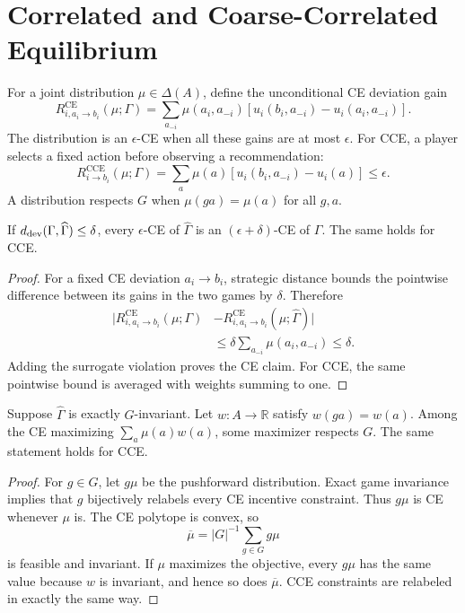 \section{Correlated and Coarse-Correlated Equilibrium}

For a joint distribution $\mu\in\Delta(A)$, define the unconditional CE deviation gain
\[
R^{\mathrm{CE}}_{i,a_i\to b_i}(\mu;\Gamma)
=
\sum_{a_{-i}}\mu(a_i,a_{-i})
[u_i(b_i,a_{-i})-u_i(a_i,a_{-i})].
\]
The distribution is an $\epsilon$-CE when all these gains are at most $\epsilon$.  For CCE, a player selects a fixed action before observing a recommendation:
\[
R^{\mathrm{CCE}}_{i\to b_i}(\mu;\Gamma)
=
\sum_a\mu(a)
[u_i(b_i,a_{-i})-u_i(a)]
\le\epsilon.
\]
A distribution respects $G$ when $\mu(ga)=\mu(a)$ for all $g,a$.

\begin{theorem}
\label{thm:supp-ce-transfer}
If $d_{\mathrm{dev}}(\Gamma,\widehat\Gamma)\le\delta$, every $\epsilon$-CE of $\widehat\Gamma$ is an $(\epsilon+\delta)$-CE of $\Gamma$.  The same holds for CCE.
\end{theorem}
\begin{proof}
For a fixed CE deviation $a_i\to b_i$, strategic distance bounds the pointwise difference between its gains in the two games by $\delta$.  Therefore
\begin{align*}
\big|R^{\mathrm{CE}}_{i,a_i\to b_i}(\mu;\Gamma)
&-R^{\mathrm{CE}}_{i,a_i\to b_i}(\mu;\widehat\Gamma)\big|\\
&\le
\delta\sum_{a_{-i}}\mu(a_i,a_{-i})
\le\delta.
\end{align*}
Adding the surrogate violation proves the CE claim.  For CCE, the same pointwise bound is averaged with weights summing to one.
\end{proof}

\begin{theorem}
\label{thm:supp-invariant-ce}
Suppose $\widehat\Gamma$ is exactly $G$-invariant.  Let
$w:A\to\mathbb R$ satisfy $w(ga)=w(a)$.  Among the CE maximizing
$\sum_a\mu(a)w(a)$, some maximizer respects $G$.  The same statement holds for CCE.
\end{theorem}
\begin{proof}
For $g\in G$, let $g\mu$ be the pushforward distribution.  Exact game invariance implies that $g$ bijectively relabels every CE incentive constraint.  Thus $g\mu$ is CE whenever $\mu$ is.  The CE polytope is convex, so
\[
\overline\mu=|G|^{-1}\sum_{g\in G}g\mu
\]
is feasible and invariant.  If $\mu$ maximizes the objective, every $g\mu$ has the same value because $w$ is invariant, and hence so does $\overline\mu$.  CCE constraints are relabeled in exactly the same way.
\end{proof}

